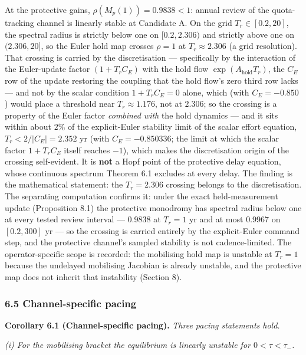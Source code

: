 \documentclass[11pt]{article}
\begin{document}
At the protective gains, \(\rho(M_p(1)) = 0.9838 < 1\): annual review of
the quota-tracking channel is linearly stable at Candidate A. On the
grid \(T_r \in [0.2, 20]\), the spectral radius is strictly below one on
\([0.2, 2.306)\) and strictly above one on \((2.306, 20]\), so the Euler
hold map crosses \(\rho = 1\) at \(T_r \approx 2.306\) (a grid
resolution). That crossing is carried by the discretisation ---
specifically by the interaction of the Euler-update factor
\((1 + T_r C_E)\) with the hold flow \(\exp(A_{\mathrm{hold}}T_r)\), the
\(C_E\) row of the update restoring the coupling that the hold flow's
zero third row lacks --- and not by the scalar condition
\(1 + T_r C_E = 0\) alone, which (with \(C_E = -0.850\)) would place a
threshold near \(T_r \approx 1.176\), not at \(2.306\); so the crossing
is a property of the Euler factor \emph{combined with} the hold dynamics
--- and it sits within about \(2\%\) of the explicit-Euler stability
limit of the scalar effort equation, \(T_r < 2/|C_E| = 2.352\) yr (with
\(C_E = -0.850336\); the limit at which the scalar factor
\(1 + T_r C_E\) itself reaches \(-1\)), which makes the discretisation
origin of the crossing self-evident. It is \textbf{not} a Hopf point of
the protective delay equation, whose continuous spectrum Theorem 6.1
excludes at every delay. The finding is the mathematical statement: the
\(T_r = 2.306\) crossing belongs to the discretisation. The separating
computation confirms it: under the exact held-measurement update
(Proposition 8.1) the protective monodromy has spectral radius below one
at every tested review interval --- 0.9838 at \(T_r = 1\) yr and at most
0.9967 on \([0.2, 300]\) yr --- so the crossing is carried entirely by
the explicit-Euler command step, and the protective channel's sampled
stability is not cadence-limited. The operator-specific scope is
recorded: the mobilising hold map is unstable at \(T_r = 1\) because the
undelayed mobilising Jacobian is already unstable, and the protective
map does not inherit that instability (Section 8).

\subsubsection{6.5 Channel-specific
pacing}\label{channel-specific-pacing}

\textbf{Corollary 6.1 (Channel-specific pacing).} \emph{Three pacing
statements hold.}

\emph{(i) For the mobilising bracket the equilibrium is linearly
unstable for \(0 < \tau < \tau_-\).}
\end{document}
